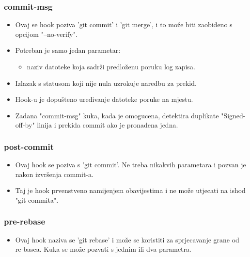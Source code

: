 \documentclass{beamer}
\begin{document}
\begin{frame}
\frametitle{commit-msg}
\begin{itemize}
    \item Ovaj se hook poziva 'git commit' i 'git merge', i to može biti
zaobideno s opcijom "--no-verify".
    \item Potreban je samo jedan parametar:
    \begin{itemize}
        \item naziv datoteke koja sadrži predloženu poruku log zapisa.
    \end{itemize}
    \item Izlazak s statusom koji nije nula uzrokuje naredbu za prekid.
    \item Hook-u je dopušteno uredivanje datoteke poruke na mjestu.
    \item Zadana "commit-msg" kuka, kada je omogucena, detektira duplikate "Signed-off-by" linija i prekida commit ako je pronadena jedna.
\end{itemize}
\end{frame}

\begin{frame}
\frametitle{post-commit}
\begin{itemize}
    \item Ovaj hook se poziva s 'git commit'. Ne treba nikakvih parametara i pozvan je nakon izvršenja commit-a.
    \item Taj je hook prvenstveno namijenjem obavijestima i ne može utjecati na ishod "git commita".
\end{itemize}
\end{frame}

\begin{frame}
\frametitle{pre-rebase}
\begin{itemize}
    \item Ovaj hook naziva se 'git rebase' i može se koristiti za sprjecavanje grane od re-basea. Kuka se može pozvati s jednim ili dva parametra.
\end{itemize}
\end{frame}
\end{document}
